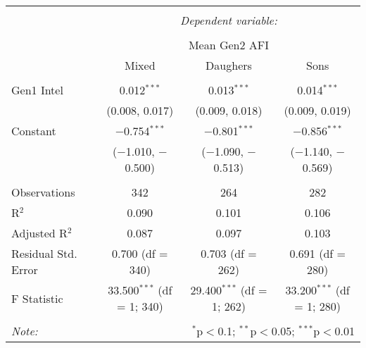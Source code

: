 
\begingroup 
\small 
\begin{tabular}{@{\extracolsep{1pt}}lccc} 
\\[-1.8ex]\hline 
\hline \\[-1.8ex] 
 & \multicolumn{3}{c}{\textit{Dependent variable:}} \\ 
\cline{2-4} 
\\[-1.8ex] & \multicolumn{3}{c}{Mean Gen2 AFI} \\ 
 & Mixed & Daughers & Sons \\ 
\hline \\[-1.8ex] 
 Gen1 Intel & 0.012$^{***}$ & 0.013$^{***}$ & 0.014$^{***}$ \\ 
  & (0.008, 0.017) & (0.009, 0.018) & (0.009, 0.019) \\ 
  Constant & $-$0.754$^{***}$ & $-$0.801$^{***}$ & $-$0.856$^{***}$ \\ 
  & ($-$1.010, $-$0.500) & ($-$1.090, $-$0.513) & ($-$1.140, $-$0.569) \\ 
 \hline \\[-1.8ex] 
Observations & 342 & 264 & 282 \\ 
R$^{2}$ & 0.090 & 0.101 & 0.106 \\ 
Adjusted R$^{2}$ & 0.087 & 0.097 & 0.103 \\ 
Residual Std. Error & 0.700 (df = 340) & 0.703 (df = 262) & 0.691 (df = 280) \\ 
F Statistic & 33.500$^{***}$ (df = 1; 340) & 29.400$^{***}$ (df = 1; 262) & 33.200$^{***}$ (df = 1; 280) \\ 
\hline 
\hline \\[-1.8ex] 
\textit{Note:}  & \multicolumn{3}{r}{$^{*}$p$<$0.1; $^{**}$p$<$0.05; $^{***}$p$<$0.01} \\ 
\end{tabular} 
\endgroup 
